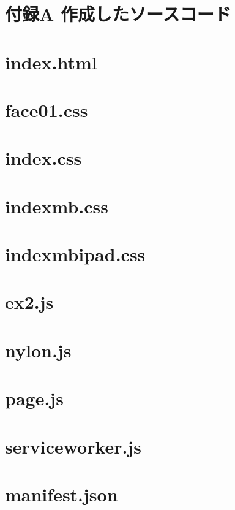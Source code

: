 \documentclass[a4j,12pt]{jarticle}
\begin{document}
\newpage
{}

\section*{付録A 作成したソースコード}
\section*{index.html}
\label{index.html}
\newpage
\section*{face01.css}
\label{face01.css}
\newpage
\section*{index.css}
\label{index.css}
\newpage

\section*{indexmb.css}
\label{indexmb.css}
\newpage

\section*{indexmbipad.css}
\label{indexmbipad.css}
\newpage

\section*{ex2.js}
\label{ex2.js}
\newpage

\section*{nylon.js}
\label{nylon.js}
\newpage

\section*{page.js}
\label{page.js}
\newpage

\section*{serviceworker.js}
\label{serviceworker.js}
\newpage

\section*{manifest.json}
\label{manifest.json}
\newpage
\end{document}
